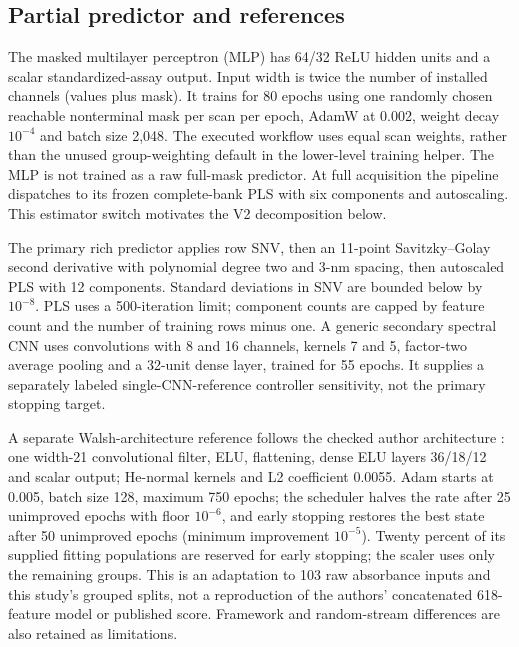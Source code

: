\documentclass[10pt,a4paper]{article}
\begin{document}
\subsection{Partial predictor and references}
The masked multilayer perceptron (MLP) has 64/32 ReLU hidden units and a scalar standardized-assay output. Input width is twice the number of installed channels (values plus mask). It trains for 80 epochs using one randomly chosen reachable nonterminal mask per scan per epoch, AdamW at 0.002, weight decay $10^{-4}$ and batch size 2,048. The executed workflow uses equal scan weights, rather than the unused group-weighting default in the lower-level training helper. The MLP is not trained as a raw full-mask predictor. At full acquisition the pipeline dispatches to its frozen complete-bank PLS with six components and autoscaling. This estimator switch motivates the V2 decomposition below.

The primary rich predictor applies row SNV, then an 11-point Savitzky--Golay second derivative with polynomial degree two and 3-nm spacing, then autoscaled PLS with 12 components. Standard deviations in SNV are bounded below by $10^{-8}$. PLS uses a 500-iteration limit; component counts are capped by feature count and the number of training rows minus one. A generic secondary spectral CNN uses convolutions with 8 and 16 channels, kernels 7 and 5, factor-two average pooling and a 32-unit dense layer, trained for 55 epochs. It supplies a separately labeled single-CNN-reference controller sensitivity, not the primary stopping target.

A separate Walsh-architecture reference follows the checked author architecture \citep{walsh2024}: one width-21 convolutional filter, ELU, flattening, dense ELU layers 36/18/12 and scalar output; He-normal kernels and L2 coefficient 0.0055. Adam starts at 0.005, batch size 128, maximum 750 epochs; the scheduler halves the rate after 25 unimproved epochs with floor $10^{-6}$, and early stopping restores the best state after 50 unimproved epochs (minimum improvement $10^{-5}$). Twenty percent of its supplied fitting populations are reserved for early stopping; the scaler uses only the remaining groups. This is an adaptation to 103 raw absorbance inputs and this study's grouped splits, not a reproduction of the authors' concatenated 618-feature model or published score. Framework and random-stream differences are also retained as limitations.
\end{document}
